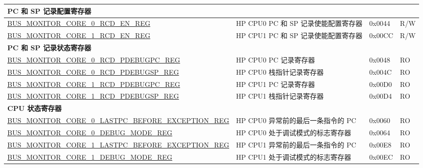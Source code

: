 \begin{longtable}{ |p{10cm} | p{9cm}| l | l | }
\multicolumn{4}{|l|}{\textbf{PC 和 SP 记录配置寄存器}} \\ \hline
\hyperref[regdesc:BUSMONITORCORE0RCDENREG]{BUS\_MONITOR\_CORE\_0\_RCD\_EN\_REG} & HP CPU0 PC 和 SP 记录使能配置寄存器 & 0x0044 & R/W \\ \hline
\hyperref[regdesc:BUSMONITORCORE1RCDENREG]{BUS\_MONITOR\_CORE\_1\_RCD\_EN\_REG} & HP CPU1 PC 和 SP 记录使能配置寄存器 & 0x00CC & R/W \\ \hline
\multicolumn{4}{|l|}{\textbf{PC 和 SP 记录状态寄存器}} \\ \hline
\hyperref[regdesc:BUSMONITORCORE0RCDPDEBUGPCREG]{BUS\_MONITOR\_CORE\_0\_RCD\_PDEBUGPC\_REG} & HP CPU0 PC 记录寄存器 & 0x0048 & RO \\ \hline
\hyperref[regdesc:BUSMONITORCORE0RCDPDEBUGSPREG]{BUS\_MONITOR\_CORE\_0\_RCD\_PDEBUGSP\_REG} & HP CPU0 栈指针记录寄存器 & 0x004C & RO \\ \hline
\hyperref[regdesc:BUSMONITORCORE1RCDPDEBUGPCREG]{BUS\_MONITOR\_CORE\_1\_RCD\_PDEBUGPC\_REG} & HP CPU1 PC 记录寄存器 & 0x00D0 & RO \\ \hline
\hyperref[regdesc:BUSMONITORCORE1RCDPDEBUGSPREG]{BUS\_MONITOR\_CORE\_1\_RCD\_PDEBUGSP\_REG} & HP CPU1 栈指针记录寄存器 & 0x00D4 & RO \\ \hline

\multicolumn{4}{|l|}{\textbf{CPU 状态寄存器}} \\ \hline
\hyperref[regdesc:BUSMONITORCORE0LASTPCBEFOREEXCEPTIONREG]{BUS\_MONITOR\_CORE\_0\_LASTPC\_BEFORE\_EXCEPTION\_REG} & HP CPU0 异常前的最后一条指令的 PC  & 0x0060 & RO \\ \hline
\hyperref[regdesc:BUSMONITORCORE0DEBUGMODEREG]{BUS\_MONITOR\_CORE\_0\_DEBUG\_MODE\_REG} & HP CPU0 处于调试模式的标志寄存器 & 0x0064 & RO \\ \hline
\hyperref[regdesc:BUSMONITORCORE1LASTPCBEFOREEXCEPTIONREG]{BUS\_MONITOR\_CORE\_1\_LASTPC\_BEFORE\_EXCEPTION\_REG} & HP CPU1 异常前的最后一条指令的 PC & 0x00E8 & RO \\ \hline
\hyperref[regdesc:BUSMONITORCORE1DEBUGMODEREG]{BUS\_MONITOR\_CORE\_1\_DEBUG\_MODE\_REG} & HP CPU1 处于调试模式的标志寄存器 & 0x00EC & RO \\ \hline


\end{longtable}
